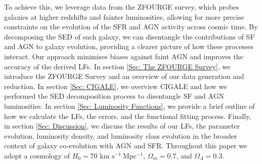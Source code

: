 To achieve this, we leverage data from the ZFOURGE survey, which probes galaxies at higher redshifts and fainter luminosities, allowing for more precise constraints on the evolution of the SFR and AGN activity across cosmic time. By decomposing the SED of each galaxy, we can disentangle the contributions of SF and AGN to galaxy evolution, providing a clearer picture of how these processes interact. Our approach minimises biases against faint AGN and improves the accuracy of the derived LFs. In section \ref{Sec: The ZFOURGE Survey}, we introduce the ZFOURGE Survey and an overview of our data generation and reduction. In section \ref{Sec: CIGALE}, we overview CIGALE and how we performed the SED decomposition process to disentangle SF and AGN luminosities. In section \ref{Sec: Luminosity Functions}, we provide a brief outline of how we calculate the LFs, the errors, and the functional fitting process. Finally, in section \ref{Sec: Discussion}, we discuss the results of our LFs, the parameter evolution, luminosity density, and luminosity class evolution in the broader context of galaxy co-evolution with AGN and SFR. Throughout this paper we adopt a cosmology of $H_0 = 70$ km $\mathrm{s^{-1}\ Mpc^{-1}}$, $\Omega_m=0.7$, and $\Omega_\Lambda=0.3$.




